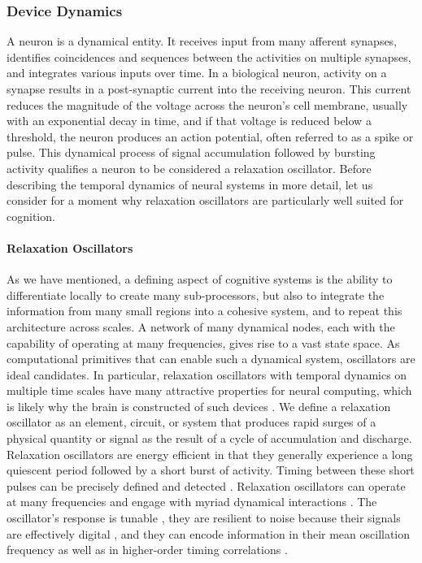 \subsubsection{Device Dynamics}
A neuron is a dynamical entity. It receives input from many afferent synapses, identifies coincidences and sequences between the activities on multiple synapses, and integrates various inputs over time. In a biological neuron, activity on a synapse results in a post-synaptic current into the receiving neuron. This current reduces the magnitude of the voltage across the neuron's cell membrane, usually with an exponential decay in time, and if that voltage is reduced below a threshold, the neuron produces an action potential, often referred to as a spike or pulse. This dynamical process of signal accumulation followed by bursting activity qualifies a neuron to be considered a relaxation oscillator. Before describing the temporal dynamics of neural systems in more detail, let us consider for a moment why relaxation oscillators are particularly well suited for cognition.

\paragraph{Relaxation Oscillators}
As we have mentioned, a defining aspect of cognitive systems is the ability to differentiate locally to create many sub-processors, but also to integrate the information from many small regions into a cohesive system, and to repeat this architecture across scales. A network of many dynamical nodes, each with the capability of operating at many frequencies, gives rise to a vast state space. As computational primitives that can enable such a dynamical system, oscillators are ideal candidates. In particular, relaxation oscillators \cite{st2015,mist1990,soko1993,lued1997,huya2000,bu2006,gile2011,vepe1968,cacl1981} with temporal dynamics on multiple time scales \cite{soko1993} have many attractive properties for neural computing, which is likely why the brain is constructed of such devices \cite{ll1988}. We define a relaxation oscillator as an element, circuit, or system that produces rapid surges of a physical quantity or signal as the result of a cycle of accumulation and discharge. Relaxation oscillators are energy efficient in that they generally experience a long quiescent period followed by a short burst of activity. Timing between these short pulses can be precisely defined and detected \cite{bu2006}. Relaxation oscillators can operate at many frequencies \cite{huya2000,more} and engage with myriad dynamical interactions \cite{lued1997}. The oscillator's response is tunable \cite{huya2000}, they are resilient to noise because their signals are effectively digital \cite{stgo2005}, and they can encode information in their mean oscillation frequency as well as in higher-order timing correlations \cite{pasc1999,thde2001,sase2001,stse2007,brcl2010,haah2015}.

